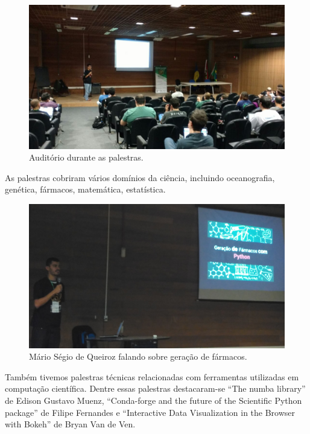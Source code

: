 \documentclass[12pt]{article}
\begin{document}
\begin{figure}[!htb]
\center
\includegraphics[height=.3\textheight]{talks-full.jpg}
\caption{Auditório durante as palestras.}
\end{figure}

As palestras cobriram vários domínios da ciência, incluindo
oceanografia,
genética,
fármacos,
matemática,
estatística.

\begin{figure}[!htb]
\center
\includegraphics[height=.3\textheight]{talks-drugs.jpg}
\caption{Mário Ségio de Queiroz falando sobre geração de fármacos.}
\end{figure}

Também tivemos palestras técnicas relacionadas com ferramentas utilizadas em
computação científica. Dentre essas palestras destacaram-se ``The numba
library'' de Edison Gustavo Muenz, ``Conda-forge and the future of the
Scientific Python package'' de Filipe Fernandes e ``Interactive Data
Visualization in the Browser with Bokeh'' de Bryan Van de Ven.
\end{document}
